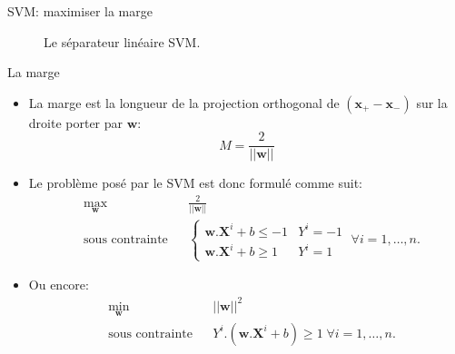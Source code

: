 \documentclass[8pt]{beamer}
\begin{document}
		\begin{frame}[plain]{SVM\@: maximiser la marge}
			\begin{figure}[H]
				
				\caption*{\tiny Le séparateur linéaire SVM.}
			\end{figure}
		\end{frame}

		\begin{frame}{La marge}
			\begin{itemize}
				\item<2-> La marge est la longueur de la projection orthogonal de $(\textbf{x}_+ - \textbf{x}_-)$ sur la droite porter par $\textbf{w}$:
					\begin{equation}
						M = \frac{2}{\vert\vert \textbf{w} \vert\vert}
					\end{equation}
				\item<2->  Le problème posé par le SVM est donc formulé comme suit:
				\begin{equation}
					\begin{aligned}
					& \max_{\textbf{w}}
					& & \frac{2}{\vert\vert \textbf{w} \vert\vert} \\
					& \text{sous contrainte}
					& & \begin{cases}
						\textbf{w}.\textbf{X}^i + b \leq -1 & Y^i = -1 \\
						\textbf{w}.\textbf{X}^i + b \geq 1 & Y^i = 1
					\end{cases} \; \forall i = 1, \dots, n.
					\end{aligned}
				\end{equation}
				\item<2->  Ou encore:
				\begin{equation}
					\begin{aligned}
					& \min_{\textbf{w}}
					& & {\vert\vert \textbf{w} \vert\vert}^2 \\
					& \text{sous contrainte}
					& & Y^i.(\textbf{w}.\textbf{X}^i + b) \geq 1 \; \forall i = 1, \dots, n.
					\end{aligned}
				\end{equation}
			\end{itemize}
		\end{frame}
\end{document}
